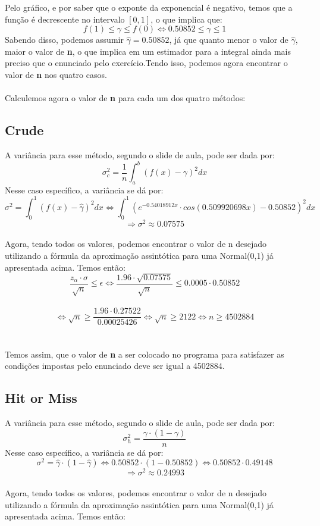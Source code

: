 \documentclass{article}
\begin{document}
    Pelo gráfico, e por saber que o exponte da exponencial é negativo, temos que a função é decrescente no intervalo $[0,1]$, o que implica que:
    $$f(1) \leq \gamma \leq f(0) \Leftrightarrow 0.50852 \leq \gamma \leq 1$$ Sabendo disso, podemos assumir $\hat{\gamma} = 0.50852$, já que quanto menor o valor de $\hat{\gamma}$, maior o valor de \textbf{n}, o que implica em um estimador para a integral ainda mais preciso que o enunciado pelo exercício.Tendo isso, podemos agora encontrar o valor de \textbf{n} nos quatro casos.\\
    \\
    Calculemos agora o valor de \textbf{n} para cada um dos quatro métodos:

\subsection{Crude}

A variância para esse método, segundo o slide de aula, pode ser dada por:
$$ \sigma^2_c = \frac{1}{n} \int_{a}^{b} (f(x) - \gamma)^2 dx $$
Nesse caso específico, a variância se dá por:
$$ \sigma^2 = \int_{0}^{1} (f(x) - \hat{\gamma})^2 dx \Leftrightarrow \int_{0}^{1} (e^{-0.54018912x}\cdot cos(0.509920698x) - 0.50852)^2 dx $$
$$ \Rightarrow \sigma^2 \approx 0.07575 $$
\\
Agora, tendo todos os valores, podemos encontrar o valor de n desejado utilizando a fórmula da aproximação assintótica para uma Normal(0,1) já apresentada acima. Temos então:\\
    
    $$\frac{z_\alpha \cdot \sigma}{\sqrt{n}} \leq \epsilon \Leftrightarrow \frac{1.96 \cdot\sqrt{0.07575}}{\sqrt{n}} \leq 0.0005\cdot 0.50852$$\\
    
    $$\Leftrightarrow \sqrt{n}\geq \frac{1.96\cdot 0.27522}{0.00025426}\Leftrightarrow \sqrt{n}\geq 2122 \Leftrightarrow n\geq 4502884$$\\
    \\
    Temos assim, que o valor de \textbf{n} a ser colocado no programa para satisfazer as condições impostas pelo enunciado deve ser igual a 4502884.

\subsection{Hit or Miss}

A variância para esse método, segundo o slide de aula, pode ser dada por:
$$ \sigma^2_h = \frac{\gamma\cdot(1-\gamma)}{n} $$
Nesse caso específico, a variância se dá por:
$$ \sigma^2 = \hat{\gamma}\cdot(1-\hat{\gamma}) \Leftrightarrow 0.50852 \cdot (1-0.50852) \Leftrightarrow 0.50852 \cdot 0.49148 $$
$$ \Rightarrow \sigma^2 \approx 0.24993 $$
\\
Agora, tendo todos os valores, podemos encontrar o valor de n desejado utilizando a fórmula da aproximação assintótica para uma Normal(0,1) já apresentada acima. Temos então:\\
    
\end{document}
